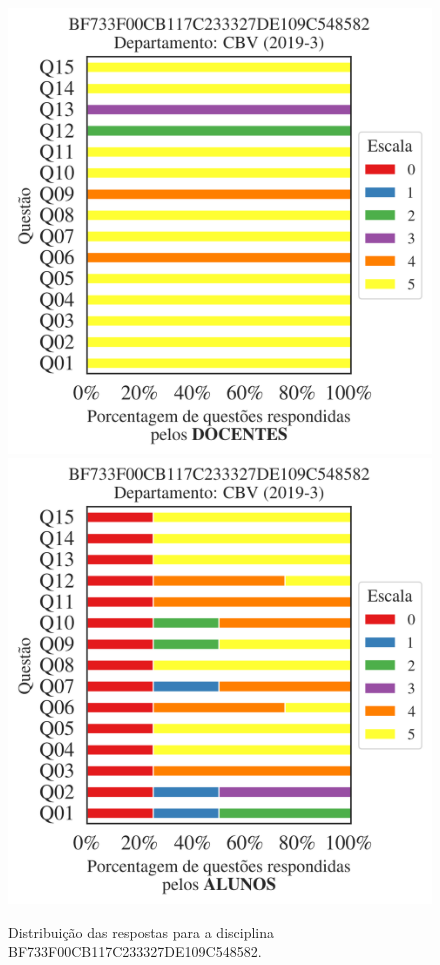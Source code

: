 \documentclass[a4paper,10pt]{article}
\begin{document}
\begin{figure}[h]
\centering
\includegraphics[width=0.485\linewidth]{analise_disciplina_departamento_CBV_BF733F00CB117C233327DE109C548582_docentes.png}
\includegraphics[width=0.485\linewidth]{analise_disciplina_departamento_CBV_BF733F00CB117C233327DE109C548582_alunos.png}
\caption{\label{fig:analise_geral_departamento}                Distribuição das respostas para a disciplina BF733F00CB117C233327DE109C548582. }
\end{figure}
\end{document}
